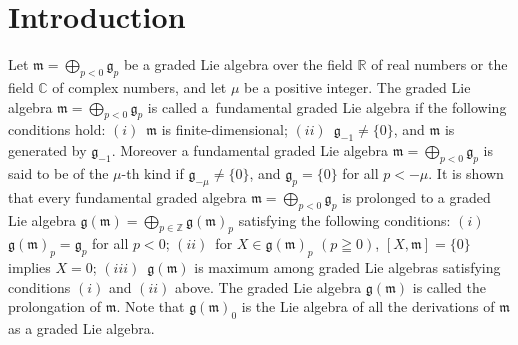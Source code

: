\documentclass[pdftex]{sigma}
\numberwithin{equation}{section}
\numberwithin{theorem}{section}
\numberwithin{proposition}{section}
\numberwithin{lemma}{section}
\numberwithin{corollary}{section}
\numberwithin{definition}{section}
\numberwithin{example}{section}
\numberwithin{remark}{section}
\numberwithin{note}{section}
\newcommand{\gla}[1]{\mathfrak#1=\bigoplus\limits_{p\in\mathbb Z}\mathfrak#1_p} \renewcommand{\labelenumi}{{\rm (\arabic{enumi})}}
\begin{document}
\allowdisplaybreaks

\renewcommand{\PaperNumber}{038}

\FirstPageHeading












\section{Introduction}

Let $\mathfrak m=\bigoplus\limits_{p<0}\mathfrak g_p$ be a graded Lie
algebra over the f\/ield $\mathbb R$ of real numbers or
the f\/ield $\mathbb C$ of complex numbers, and let $\mu$ be a positive integer.
The graded Lie algebra $\mathfrak m=\bigoplus\limits_{p<0}\mathfrak g_p $ is
called a~fundamental graded Lie algebra if the following conditions hold:
$(i)$~$\mathfrak m$ is f\/inite-dimensional; $(ii)$~$\mathfrak g_{-1}\ne\{0\}$, and
$\mathfrak m$ is generated by $\mathfrak g_{-1}$.
Moreover a fundamental graded Lie algebra
$\mathfrak m=\bigoplus\limits_{p<0}\mathfrak g_p$ is said to be
of the $\mu$-th kind if $\mathfrak g_{-\mu}\ne\{0\}$, and $\mathfrak g_p=\{0\}$ for all $p<-\mu$.
It is shown that every fundamental graded algebra $\mathfrak m=\bigoplus\limits_{p<0}\mathfrak g_p$
is prolonged to a graded Lie algebra $\gla{g (\mathfrak m)}$ satisfying the following conditions:
$(i)$~$\mathfrak g(\mathfrak m)_p=\mathfrak g_p$ for all $p<0$;
$(ii)$~for $X\in\mathfrak g(\mathfrak m)_p$ $(p\geqq0)$,
$[X,\mathfrak m]=\{0\}$ implies $X=0$;
$(iii)$~$\mathfrak g (\mathfrak m)$ is maximum among graded Lie algebras
satisfying conditions $(i)$ and $(ii)$ above.
The graded Lie algebra $\mathfrak g (\mathfrak m)$ is called the prolongation of
$\mathfrak m$.
Note that  $\mathfrak g(\mathfrak m)_0$  is the Lie algebra of all the
derivations of $\mathfrak m$ as a graded Lie algebra.
\end{document}
